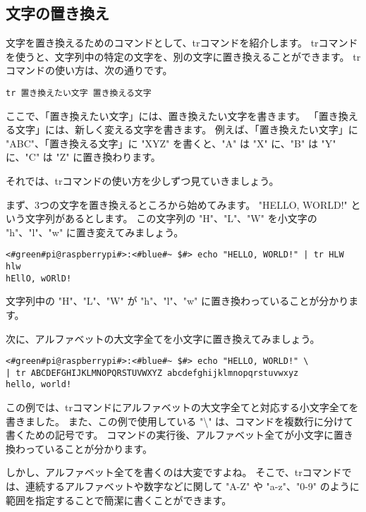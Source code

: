 \subsection{文字の置き換え}
文字を置き換えるためのコマンドとして、trコマンドを紹介します。
trコマンドを使うと、文字列中の特定の文字を、別の文字に置き換えることができます。
trコマンドの使い方は、次の通りです。

\begin{lstlisting}[caption=trコマンドの使い方, label=tr_basic_usage]
tr 置き換えたい文字 置き換える文字
\end{lstlisting}

ここで、「置き換えたい文字」には、置き換えたい文字を書きます。
「置き換える文字」には、新しく変える文字を書きます。
例えば、「置き換えたい文字」に "ABC"、「置き換える文字」に "XYZ" を書くと、"A" は "X" に、"B" は "Y" に、"C" は "Z" に置き換わります。

それでは、trコマンドの使い方を少しずつ見ていきましょう。

まず、3つの文字を置き換えるところから始めてみます。
"HELLO, WORLD!" という文字列があるとします。
この文字列の "H"、"L"、"W" を小文字の "h"、"l"、"w" に置き変えてみましょう。

\begin{lstlisting}[caption=3文字の置き換え, label=tr_3_chars]
<#green#pi@raspberrypi#>:<#blue#~ $#> echo "HELLO, WORLD!" | tr HLW hlw
hEllO, wORlD!
\end{lstlisting}

文字列中の "H"、"L"、"W" が "h"、"l"、"w" に置き換わっていることが分かります。

次に、アルファベットの大文字全てを小文字に置き換えてみましょう。

\begin{lstlisting}[caption=アルファベット全体の置き換え, label=tr_all_chars]
<#green#pi@raspberrypi#>:<#blue#~ $#> echo "HELLO, WORLD!" \
| tr ABCDEFGHIJKLMNOPQRSTUVWXYZ abcdefghijklmnopqrstuvwxyz
hello, world!
\end{lstlisting}

この例では、trコマンドにアルファベットの大文字全てと対応する小文字全てを書きました。
また、この例で使用している "\textbackslash" は、コマンドを複数行に分けて書くための記号です。
コマンドの実行後、アルファベット全てが小文字に置き換わっていることが分かります。

しかし、アルファベット全てを書くのは大変ですよね。
そこで、trコマンドでは、連続するアルファベットや数字などに関して "A-Z" や "a-z"、"0-9" のように範囲を指定することで簡潔に書くことができます。

